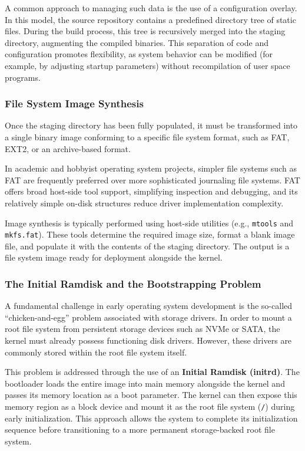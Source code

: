 \documentclass[a4paper,10pt,twoside]{report}
\theoremstyle{definition}
\begin{document}
A common approach to managing such data is the use of a configuration overlay. In this model, the source repository contains a predefined directory tree of static files. During the build process, this tree is recursively merged into the staging directory, augmenting the compiled binaries. This separation of code and configuration promotes flexibility, as system behavior can be modified (for example, by adjusting startup parameters) without recompilation of user space programs.

\subsubsection{File System Image Synthesis}

Once the staging directory has been fully populated, it must be transformed into a single binary image conforming to a specific file system format, such as FAT, EXT2, or an archive-based format.

In academic and hobbyist operating system projects, simpler file systems such as FAT are frequently preferred over more sophisticated journaling file systems. FAT offers broad host-side tool support, simplifying inspection and debugging, and its relatively simple on-disk structures reduce driver implementation complexity.

Image synthesis is typically performed using host-side utilities (e.g., \texttt{mtools} and \texttt{mkfs.fat}). These tools determine the required image size, format a blank image file, and populate it with the contents of the staging directory. The output is a file system image ready for deployment alongside the kernel.

\subsubsection{The Initial Ramdisk and the Bootstrapping Problem}

A fundamental challenge in early operating system development is the so-called “chicken-and-egg” problem associated with storage drivers. In order to mount a root file system from persistent storage devices such as NVMe or SATA, the kernel must already possess functioning disk drivers. However, these drivers are commonly stored within the root file system itself.

This problem is addressed through the use of an \textbf{Initial Ramdisk (initrd)}. The bootloader loads the entire image into main memory alongside the kernel and passes its memory location as a boot parameter. The kernel can then expose this memory region as a block device and mount it as the root file system (\texttt{/}) during early initialization. This approach allows the system to complete its initialization sequence before transitioning to a more permanent storage-backed root file system.
\end{document}
